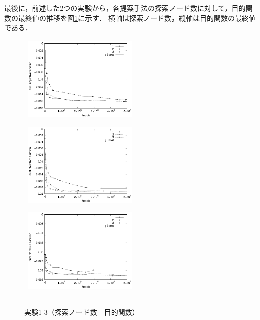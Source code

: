 最後に，前述した2つの実験から，各提案手法の探索ノード数に対して，目的関数の最終値の推移を図\ref{1-3}に示す．
横軸は探索ノード数，縦軸は目的関数の最終値である．
\begin{figure}[t]
	\begin{center}
		\begin{tabular}{c}
			\begin{minipage}{0.33\hsize}
				\begin{center}
					\includegraphics[width=55mm]{cpdb/purpose_node_1.eps}
				\end{center}
				\vspace{0.5cm}
				\subcaption{$\nu = 0.1$}
				\label{fig:7}
			\end{minipage}
			\begin{minipage}{0.33\hsize}
				\begin{center}
					\includegraphics[width=55mm]{cpdb/purpose_node_3.eps}
				\end{center}
				\vspace{0.5cm}
				\subcaption{$\nu = 0.3$}
				\label{fig:8}
			\end{minipage}
			\begin{minipage}{0.33\hsize}
				\begin{center}
					\includegraphics[width=55mm]{cpdb/purpose_node_5.eps}
				\end{center}
				\vspace{0.5cm}
				\subcaption{$\nu = 0.5$}
				\label{fig:9}
			\end{minipage}
			\vspace{0.5cm}
		\end{tabular}
		\caption{実験1-3（探索ノード数 - 目的関数）}
		\label{1-3}
	\end{center}
\end{figure}

